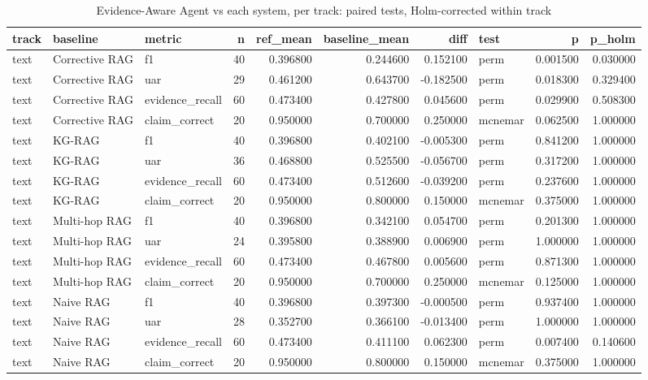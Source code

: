 \begin{table}
\caption{Evidence-Aware Agent vs each system, per track: paired tests, Holm-corrected within track}
\label{tab:table_significance}
\begin{tabular}{lllrrrrlrr}
\toprule
track & baseline & metric & n & ref\_mean & baseline\_mean & diff & test & p & p\_holm \\
\midrule
text & Corrective RAG & f1 & 40 & 0.396800 & 0.244600 & 0.152100 & perm & 0.001500 & 0.030000 \\
text & Corrective RAG & uar & 29 & 0.461200 & 0.643700 & -0.182500 & perm & 0.018300 & 0.329400 \\
text & Corrective RAG & evidence\_recall & 60 & 0.473400 & 0.427800 & 0.045600 & perm & 0.029900 & 0.508300 \\
text & Corrective RAG & claim\_correct & 20 & 0.950000 & 0.700000 & 0.250000 & mcnemar & 0.062500 & 1.000000 \\
text & KG-RAG & f1 & 40 & 0.396800 & 0.402100 & -0.005300 & perm & 0.841200 & 1.000000 \\
text & KG-RAG & uar & 36 & 0.468800 & 0.525500 & -0.056700 & perm & 0.317200 & 1.000000 \\
text & KG-RAG & evidence\_recall & 60 & 0.473400 & 0.512600 & -0.039200 & perm & 0.237600 & 1.000000 \\
text & KG-RAG & claim\_correct & 20 & 0.950000 & 0.800000 & 0.150000 & mcnemar & 0.375000 & 1.000000 \\
text & Multi-hop RAG & f1 & 40 & 0.396800 & 0.342100 & 0.054700 & perm & 0.201300 & 1.000000 \\
text & Multi-hop RAG & uar & 24 & 0.395800 & 0.388900 & 0.006900 & perm & 1.000000 & 1.000000 \\
text & Multi-hop RAG & evidence\_recall & 60 & 0.473400 & 0.467800 & 0.005600 & perm & 0.871300 & 1.000000 \\
text & Multi-hop RAG & claim\_correct & 20 & 0.950000 & 0.700000 & 0.250000 & mcnemar & 0.125000 & 1.000000 \\
text & Naive RAG & f1 & 40 & 0.396800 & 0.397300 & -0.000500 & perm & 0.937400 & 1.000000 \\
text & Naive RAG & uar & 28 & 0.352700 & 0.366100 & -0.013400 & perm & 1.000000 & 1.000000 \\
text & Naive RAG & evidence\_recall & 60 & 0.473400 & 0.411100 & 0.062300 & perm & 0.007400 & 0.140600 \\
text & Naive RAG & claim\_correct & 20 & 0.950000 & 0.800000 & 0.150000 & mcnemar & 0.375000 & 1.000000 \\

\end{tabular}
\end{table}
